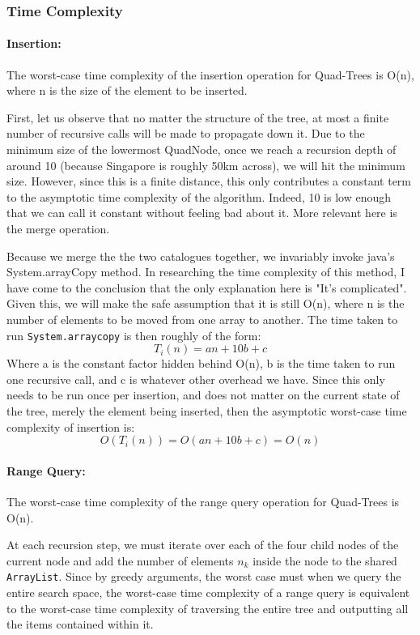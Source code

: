\documentclass[12pt]{article}
\begin{document}
{\subsubsection{Time Complexity}

\paragraph{Insertion:} 

The worst-case time complexity of the insertion operation for Quad-Trees is O(n), where n is the size of the element to be inserted.

First, let us observe that no matter the structure of the tree, at most a finite number of recursive calls will be made to propagate down it. Due to the minimum size of the lowermost QuadNode, once we reach a recursion depth of around 10 (because Singapore is roughly 50km across), we will hit the minimum size. However, since this is a finite distance, this only contributes a constant term to the asymptotic time complexity of the algorithm. Indeed, 10 is low enough that we can call it constant without feeling bad about it. More relevant here is the merge operation.

Because we merge the the two catalogues together, we invariably invoke java's System.arrayCopy method. In researching the time complexity of this method, I have come to the conclusion that the only explanation here is "It's complicated". Given this, we will make the safe assumption that it is still O(n), where n is the number of elements to be moved from one array to another. \newline
The time taken to run \texttt{System.arraycopy} is then roughly of the form:
$$T_i(n) = an + 10b + c$$
Where a is the constant factor hidden behind O(n), b is the time taken to run one recursive call, and c is whatever other overhead we have. Since this only needs to be run once per insertion, and does not matter on the current state of the tree, merely the element being inserted, then the asymptotic worst-case time complexity of insertion is:
$$O(T_i(n)) = O(an + 10b + c) = O(n)$$



\paragraph{Range Query:} 
The worst-case time complexity of the range query operation for Quad-Trees is O(n).

At each recursion step, we must iterate over each of the four child nodes of the current node and add the number of elements $n_k$ inside the node to the shared \texttt{ArrayList}. Since by greedy arguments, the worst case must when we query the entire search space, the worst-case time complexity of a range query is equivalent to the worst-case time complexity of traversing the entire tree and outputting all the items contained within it. 

}
\end{document}
